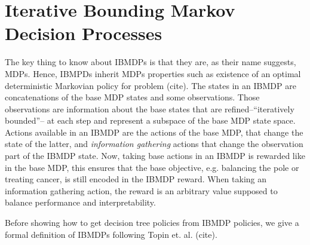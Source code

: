 \section{Iterative Bounding Markov Decision Processes}

The key thing to know about IBMDPs is that they are, as their name suggests, MDPs.
Hence, IBMPDs inherit MDPs properties such as existence of an optimal deterministic Markovian policy for problem (cite).
The states in an IBMDP are concatenations of the base MDP states and some observations. Those observations are information about the base states that are refined--``iteratively bounded''-- at each step and represent a subspace of the base MDP state space.
Actions available in an IBMDP are the actions of the base MDP, that change the state of the latter, and \textit{information gathering} actions that change the observation part of the IBMDP state.
Now, taking base actions in an IBMDP is rewarded like in the base MDP, this ensures that the base objective, e.g. balancing the pole or treating cancer, is still encoded in the IBMDP reward. When taking an information gathering action, the reward is an arbitrary value supposed to balance performance and interpretability.
 
Before showing how to get decision tree policies from IBMDP policies, we give a formal definition of IBMDPs following Topin et. al. (cite).

